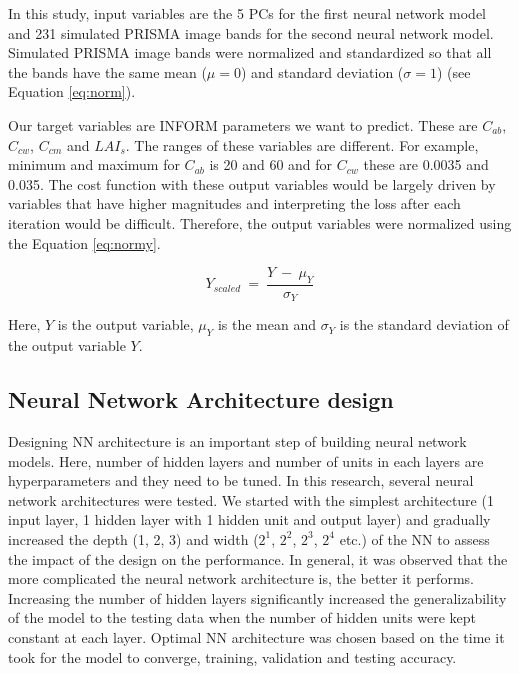 \documentclass[a4paper, twoside]{templates/ociamthesis}
\begin{document}
In this study, input variables are the 5 PCs for the first neural network model and 231 simulated PRISMA image bands for the second neural network model. Simulated PRISMA image bands were normalized and standardized so that all the bands have the same mean (\(\mu = 0\)) and standard deviation (\(\sigma = 1\)) (see Equation \eqref{eq:norm}).

Our target variables are INFORM parameters we want to predict. These are \(C_{ab}\), \(C_{cw}\), \(C_{cm}\) and \(LAI_{s}\). The ranges of these variables are different. For example, minimum and maximum for \(C_{ab}\) is 20 and 60 and for \(C_{cw}\) these are 0.0035 and 0.035. The cost function with these output variables would be largely driven by variables that have higher magnitudes and interpreting the loss after each iteration would be difficult. Therefore, the output variables were normalized using the Equation \eqref{eq:normy}.

\begin{equation}
Y_{scaled}\ =\ \frac{Y\ -\ \mu_{Y}}{\sigma_{Y}}
\label{eq:normy}
\end{equation}

Here, \(Y\) is the output variable, \(\mu_{Y}\) is the mean and \(\sigma_{Y}\) is the standard deviation of the output variable \(Y\).

\hypertarget{neural-network-architecture-design}{%
\subsection{Neural Network Architecture design}\label{neural-network-architecture-design}}

Designing NN architecture is an important step of building neural network models. Here, number of hidden layers and number of units in each layers are hyperparameters and they need to be tuned. In this research, several neural network architectures were tested. We started with the simplest architecture (1 input layer, 1 hidden layer with 1 hidden unit and output layer) and gradually increased the depth (1, 2, 3) and width (\(2^{1}\), \(2^{2}\), \(2^{3}\), \(2^{4}\) etc.) of the NN to assess the impact of the design on the performance. In general, it was observed that the more complicated the neural network architecture is, the better it performs. Increasing the number of hidden layers significantly increased the generalizability of the model to the testing data when the number of hidden units were kept constant at each layer. Optimal NN architecture was chosen based on the time it took for the model to converge, training, validation and testing accuracy.
\end{document}
